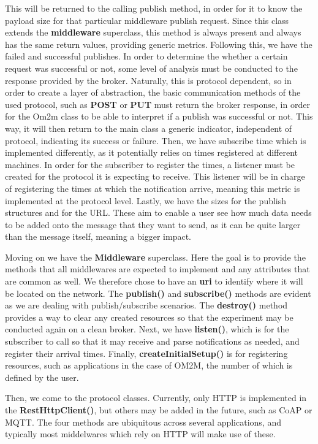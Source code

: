 \documentclass[conference]{IEEEtran}
\begin{document}
This will be returned to the calling publish method, in order for it to know the payload size for that particular middleware publish request. Since this class extends the \textbf{middleware} superclass, this method is always present and always has the same return values, providing generic metrics.
Following this, we have the failed and successful publishes. In order to determine the whether a certain request was successful or not, some level of analysis must be conducted to the response provided by the broker. Naturally, this is protocol dependent, so in order to create a layer of abstraction, the basic communication methods of the used protocol, such as \textbf{POST} or \textbf{PUT} must return the broker response, in order for the Om2m class to be able to interpret if a publish was successful or not. This way, it will then return to the main class a generic indicator, independent of protocol, indicating its success or failure. 
Then, we have subscribe time which is implemented differently, as it potentially relies on times registered at different machines. In order for the subscriber to register the times, a listener must be created for the protocol it is expecting to receive. This listener will be in charge of registering the times at which the notification arrive, meaning this metric is implemented at the protocol level. Lastly, we have the sizes for the publish structures and for the URL. These aim to enable a user see how much data needs to be added onto the message that they want to send, as it can be quite larger than the message itself, meaning a bigger impact.

Moving on we have the \textbf{Middleware} superclass. Here the goal is to provide the methods that all middlewares are expected to implement and any attributes that are common as well. We therefore chose to have an \textbf{uri} to identify where it will be located on the network. The \textbf{publish()} and \textbf{subscribe()} methods are evident as we are dealing with publish/subscribe scenarios. The \textbf{destroy()} method provides a way to clear any created resources so that the experiment may be conducted again on a clean broker. Next, we have \textbf{listen()}, which is for the subscriber to call so that it may receive and parse notifications as needed, and register their arrival times. Finally, \textbf{createInitialSetup()} is for registering resources, such as applications in the case of OM2M, the number of which is defined by the user.

Then, we come to the protocol classes. Currently, only HTTP is implemented in the \textbf{RestHttpClient()}, but others may be added in the future, such as CoAP or MQTT\@. The four methods are ubiquitous across several applications, and typically most middelwares which rely on HTTP will make use of these. 
\end{document}
